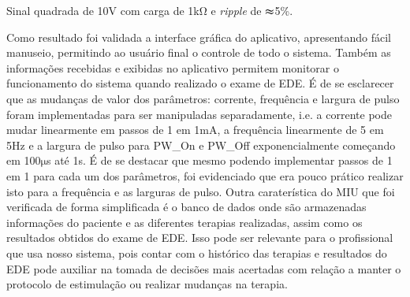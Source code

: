          Sinal  quadrada  de  10V  com  carga  de  1k$\mathrm{\Omega}$ e  \textit{ripple}  de $\mathbf{\thickapprox}$5\%. 
         
         Como  resultado  foi  validada  a  interface  gráfica  do  aplicativo,  apresentando  fácil  manuseio,  permitindo  ao  usuário  final  o  controle  de  todo  o  sistema.  Também  as  informações  recebidas  e  exibidas  no  aplicativo  permitem  monitorar  o  funcionamento  do  sistema  quando  realizado  o  exame  de  EDE.    É  de  se  esclarecer  que  as  mudanças  de  valor  dos  parâmetros:  corrente,  frequência  e  largura  de  pulso  foram  implementadas  para  ser  manipuladas  separadamente,  i.e.  a  corrente  pode  mudar  linearmente  em  passos  de  1  em  1mA,  a  frequência  linearmente  de  5  em  5Hz  e  a  largura  de  pulso  para  PW\_{On}  e  PW\_{Off}  exponencialmente  começando  em  100$\mathrm{\mu}$s  até  1s.  É  de  se  destacar  que  mesmo  podendo  implementar  passos  de  1  em  1  para  cada  um  dos  parâmetros,  foi  evidenciado  que  era  pouco  prático  realizar  isto  para  a  frequência  e  as  larguras  de  pulso.  Outra  caraterística  do  MIU  que  foi  verificada  de  forma  simplificada  é  o  banco  de  dados  onde  são  armazenadas  informações  do  paciente  e  as  diferentes  terapias  realizadas,  assim  como  os  resultados  obtidos  do  exame  de  EDE.  Isso  pode  ser  relevante  para  o  profissional  que  usa  nosso  sistema,  pois  contar  com  o  histórico  das  terapias  e  resultados  do  EDE  pode  auxiliar  na  tomada  de  decisões  mais  acertadas  com  relação  a  manter  o  protocolo  de  estimulação  ou  realizar  mudanças  na  terapia. 
         